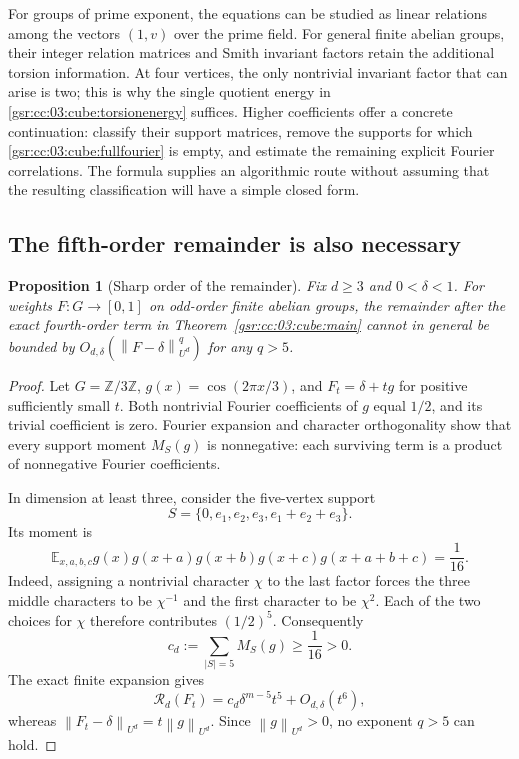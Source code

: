 \documentclass[11pt,letterpaper]{article}
\numberwithin{equation}{section}
\newtheorem{proposition}[theorem]{Proposition}
\theoremstyle{definition}
\theoremstyle{remark}
\newcommand{\E}{\mathbb E}
\newcommand{\Z}{\mathbb Z}
\newcommand{\1}{\mathbf 1}
\newcommand{\norm}[1]{\left\|#1\right\|}
\begin{document}
For groups of prime exponent, the equations can be studied as linear
relations among the vectors $(1,v)$ over the prime field.  For general
finite abelian groups, their integer relation matrices and Smith
invariant factors retain the additional torsion information.  At four
vertices, the only nontrivial invariant factor that can arise is two;
this is why the single quotient energy in
\eqref{gsr:cc:03:cube:torsionenergy} suffices.  Higher coefficients offer a
concrete continuation: classify their support matrices, remove the
supports for which \eqref{gsr:cc:03:cube:fullfourier} is empty, and estimate the
remaining explicit Fourier correlations.  The formula supplies an
algorithmic route without assuming that the resulting classification
will have a simple closed form.


\subsection{The fifth-order remainder is also necessary}

\begin{proposition}[Sharp order of the remainder]
\label{gsr:cc:03:cube:remaindersharp}
Fix $d\geq3$ and $0<\delta<1$.  For weights $F:G\to[0,1]$ on
odd-order finite abelian groups, the remainder after the exact
fourth-order term in Theorem~\ref{gsr:cc:03:cube:main} cannot in general be
bounded by $O_{d,\delta}(\norm{F-\delta}_{U^d}^{q})$ for any $q>5$.
\end{proposition}

\begin{proof}
Let $G=\Z/3\Z$, $g(x)=\cos(2\pi x/3)$, and
$F_t=\delta+t g$ for positive sufficiently small $t$.  Both nontrivial
Fourier coefficients of $g$ equal $1/2$, and its trivial coefficient
is zero.  Fourier expansion and character orthogonality show that
every support moment $M_S(g)$ is nonnegative: each surviving term is
a product of nonnegative Fourier coefficients.

In dimension at least three, consider the five-vertex support
\[
 S=\{0,e_1,e_2,e_3,e_1+e_2+e_3\}.
\]
Its moment is
\[
 \E_{x,a,b,c}g(x)g(x+a)g(x+b)g(x+c)g(x+a+b+c)=\frac1{16}.
\]
Indeed, assigning a nontrivial character $\chi$ to the last factor
forces the three middle characters to be $\chi^{-1}$ and the first
character to be $\chi^2$.  Each of the two choices for $\chi$ therefore
contributes $(1/2)^5$.  Consequently
\[
 c_d:=\sum_{|S|=5}M_S(g)\geq\frac1{16}>0.
\]
The exact finite expansion gives
\[
 \mathcal R_d(F_t)
   =c_d\delta^{m-5}t^5+O_{d,\delta}(t^6),
\]
whereas $\norm{F_t-\delta}_{U^d}=t\norm g_{U^d}$.
Since $\norm g_{U^d}>0$, no exponent $q>5$ can hold.
\end{proof}
\end{document}
